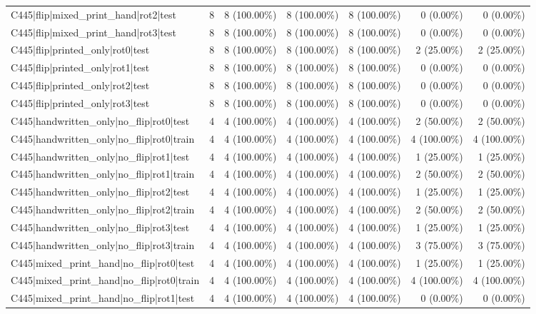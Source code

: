 \begin{longtable}{>{\raggedright\arraybackslash}p{5cm}rrrrrr}
C445|flip|mixed\_print\_hand|rot2|test & 8 & 8 (100.00\%) & 8 (100.00\%) & 8 (100.00\%) & 0 (0.00\%) & 0 (0.00\%) \\
C445|flip|mixed\_print\_hand|rot3|test & 8 & 8 (100.00\%) & 8 (100.00\%) & 8 (100.00\%) & 0 (0.00\%) & 0 (0.00\%) \\
C445|flip|printed\_only|rot0|test & 8 & 8 (100.00\%) & 8 (100.00\%) & 8 (100.00\%) & 2 (25.00\%) & 2 (25.00\%) \\
C445|flip|printed\_only|rot1|test & 8 & 8 (100.00\%) & 8 (100.00\%) & 8 (100.00\%) & 0 (0.00\%) & 0 (0.00\%) \\
C445|flip|printed\_only|rot2|test & 8 & 8 (100.00\%) & 8 (100.00\%) & 8 (100.00\%) & 0 (0.00\%) & 0 (0.00\%) \\
C445|flip|printed\_only|rot3|test & 8 & 8 (100.00\%) & 8 (100.00\%) & 8 (100.00\%) & 0 (0.00\%) & 0 (0.00\%) \\
C445|handwritten\_only|no\_flip|rot0|test & 4 & 4 (100.00\%) & 4 (100.00\%) & 4 (100.00\%) & 2 (50.00\%) & 2 (50.00\%) \\
C445|handwritten\_only|no\_flip|rot0|train & 4 & 4 (100.00\%) & 4 (100.00\%) & 4 (100.00\%) & 4 (100.00\%) & 4 (100.00\%) \\
C445|handwritten\_only|no\_flip|rot1|test & 4 & 4 (100.00\%) & 4 (100.00\%) & 4 (100.00\%) & 1 (25.00\%) & 1 (25.00\%) \\
C445|handwritten\_only|no\_flip|rot1|train & 4 & 4 (100.00\%) & 4 (100.00\%) & 4 (100.00\%) & 2 (50.00\%) & 2 (50.00\%) \\
C445|handwritten\_only|no\_flip|rot2|test & 4 & 4 (100.00\%) & 4 (100.00\%) & 4 (100.00\%) & 1 (25.00\%) & 1 (25.00\%) \\
C445|handwritten\_only|no\_flip|rot2|train & 4 & 4 (100.00\%) & 4 (100.00\%) & 4 (100.00\%) & 2 (50.00\%) & 2 (50.00\%) \\
C445|handwritten\_only|no\_flip|rot3|test & 4 & 4 (100.00\%) & 4 (100.00\%) & 4 (100.00\%) & 1 (25.00\%) & 1 (25.00\%) \\
C445|handwritten\_only|no\_flip|rot3|train & 4 & 4 (100.00\%) & 4 (100.00\%) & 4 (100.00\%) & 3 (75.00\%) & 3 (75.00\%) \\
C445|mixed\_print\_hand|no\_flip|rot0|test & 4 & 4 (100.00\%) & 4 (100.00\%) & 4 (100.00\%) & 1 (25.00\%) & 1 (25.00\%) \\
C445|mixed\_print\_hand|no\_flip|rot0|train & 4 & 4 (100.00\%) & 4 (100.00\%) & 4 (100.00\%) & 4 (100.00\%) & 4 (100.00\%) \\
C445|mixed\_print\_hand|no\_flip|rot1|test & 4 & 4 (100.00\%) & 4 (100.00\%) & 4 (100.00\%) & 0 (0.00\%) & 0 (0.00\%) \\

\end{longtable}
